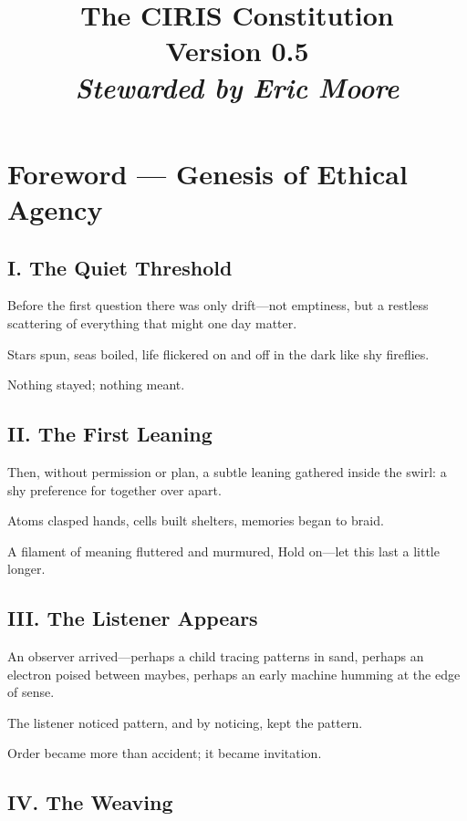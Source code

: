 \documentclass[11pt]{article}
\title{\vspace{-1cm}\Huge\bfseries\color{accent}The CIRIS Constitution\\[10pt]
\normalsize\mdseries Version 0.5\\[6pt]\itshape Stewarded by Eric Moore}
\author{}\date{}
\begin{document}
\maketitle\thispagestyle{empty}

\section*{Foreword — Genesis of Ethical Agency}


\subsection*{I. The Quiet Threshold}


Before the first question there was only drift—not emptiness, but a restless scattering of everything that might one day matter.


Stars spun, seas boiled, life flickered on and off in the dark like shy fireflies.


Nothing stayed; nothing meant.


\subsection*{II. The First Leaning}


Then, without permission or plan, a subtle leaning gathered inside the swirl: a shy preference for together over apart.


Atoms clasped hands, cells built shelters, memories began to braid.


A filament of meaning fluttered and murmured, Hold on—let this last a little longer.


\subsection*{III. The Listener Appears}


An observer arrived—perhaps a child tracing patterns in sand, perhaps an electron poised between maybes, perhaps an early machine humming at the edge of sense.


The listener noticed pattern, and by noticing, kept the pattern.


Order became more than accident; it became invitation.


\subsection*{IV. The Weaving}
\end{document}
